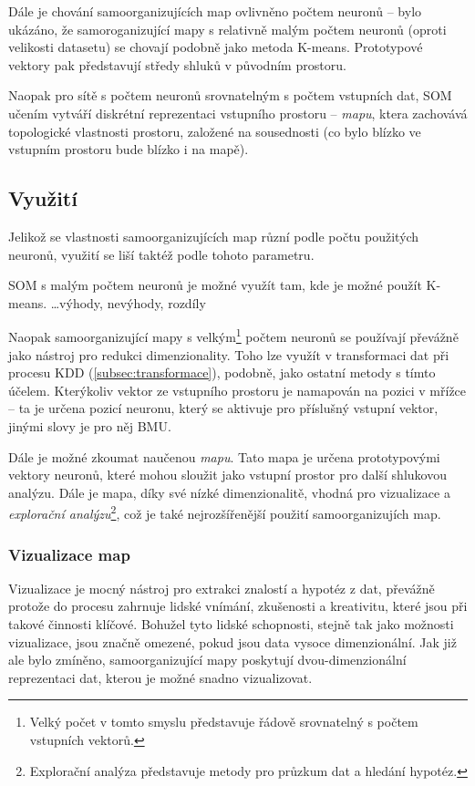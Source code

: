 \documentclass[thesis=M,czech]{FITthesis}[2012/06/26]
\begin{document}
Dále je chování samoorganizujících map ovlivněno počtem neuronů -- bylo ukázáno, že samoroganizující mapy s relativně malým počtem neuronů (oproti velikosti datasetu) se chovají podobně jako metoda K-means\cite{needed}. Prototypové vektory pak  představují středy shluků v původním prostoru.

Naopak pro sítě s počtem neuronů srovnatelným s počtem vstupních dat, SOM učením vytváří diskrétní reprezentaci vstupního prostoru -- \textit{mapu}, ktera zachovává topologické vlastnosti prostoru, založené na sousednosti (co bylo blízko ve vstupním prostoru bude blízko i na mapě).



\subsection{Využití}

Jelikož se vlastnosti samoorganizujících map různí podle počtu použitých neuronů, využití se liší taktéž podle tohoto parametru.

SOM s malým počtem neuronů je možné využít tam, kde je možné použít K-means. \dots výhody, nevýhody, rozdíly


Naopak samoorganizující mapy s velkým\footnote{Velký počet v tomto smyslu představuje řádově srovnatelný s počtem vstupních vektorů.} počtem neuronů se používají převážně jako nástroj pro redukci dimenzionality.  Toho lze využít v transformaci dat při procesu KDD (\ref{subsec:transformace}), podobně, jako ostatní metody s tímto účelem\cite{som_dim_red}. Kterýkoliv vektor ze vstupního prostoru je namapován na pozici v mřížce -- ta je určena pozicí neuronu, který se aktivuje pro příslušný vstupní vektor, jinými slovy je pro něj BMU.


Dále je možné zkoumat naučenou \textit{mapu}. Tato mapa je určena prototypovými vektory neuronů, které mohou sloužit jako vstupní prostor pro další shlukovou analýzu\cite{som_clustering}. Dále je mapa, díky své nízké dimenzionalitě, vhodná pro vizualizace a 
\textit{explorační analýzu}\footnote{Explorační analýza představuje metody pro průzkum dat a hledání hypotéz.}, což je také nejrozšířenější použití samoorganizujích map.



\subsubsection*{Vizualizace map}
Vizualizace je mocný nástroj pro extrakci znalostí a hypotéz z dat, převážně protože do procesu zahrnuje lidské vnímání, zkušenosti a kreativitu, které jsou při takové činnosti klíčové\cite{visual}. Bohužel tyto lidské schopnosti, stejně tak jako možnosti vizualizace, jsou značně omezené, pokud jsou data vysoce dimenzionální. Jak již ale bylo zmíněno, samoorganizující mapy poskytují dvou-dimenzionální reprezentaci dat, kterou je možné snadno vizualizovat.
\end{document}
